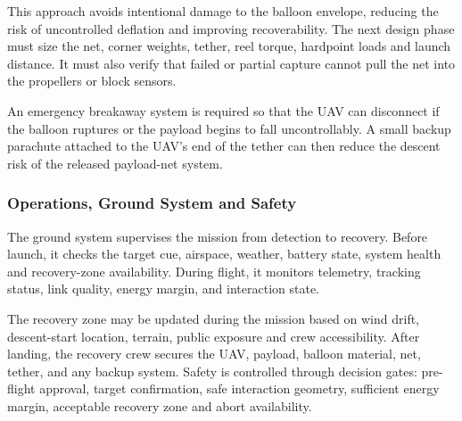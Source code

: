This approach avoids intentional damage to the balloon envelope, reducing the risk of uncontrolled deflation and improving recoverability. The next design phase must size the net, corner weights, tether, reel torque, hardpoint loads and launch distance. It must also verify that failed or partial capture cannot pull the net into the propellers or block sensors.

An emergency breakaway system is required so that the UAV can disconnect if the balloon ruptures or the payload begins to fall uncontrollably. A small backup parachute attached to the UAV's end of the tether can then reduce the descent risk of the released payload-net system.

\subsubsection{Operations, Ground System and Safety}
\label{subsubsec:concept_a_operations_ground_safety}




The ground system supervises the mission from detection to recovery. Before launch, it checks the target cue, airspace, weather, battery state, system health and recovery-zone availability. During flight, it monitors telemetry, tracking status, link quality, energy margin, and interaction state.

The recovery zone may be updated during the mission based on wind drift, descent-start location, terrain, public exposure and crew accessibility. After landing, the recovery crew secures the UAV, payload, balloon material, net, tether, and any backup system. Safety is controlled through decision gates: pre-flight approval, target confirmation, safe interaction geometry, sufficient energy margin, acceptable recovery zone and abort availability.







